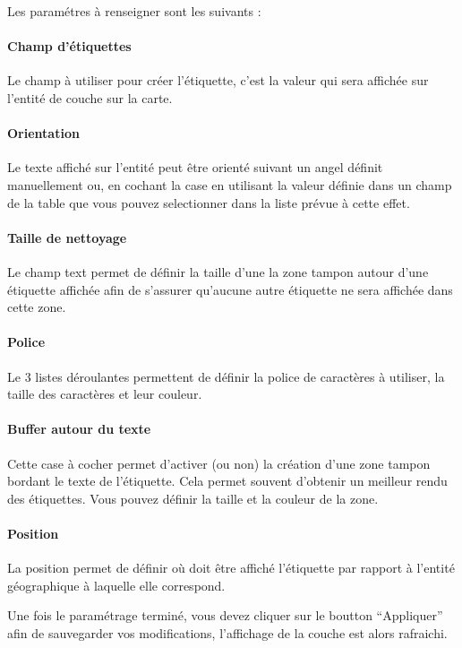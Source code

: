 \documentclass[letterpaper,10pt,french]{sphinxmanual}
\begin{document}
Les paramétres à renseigner sont les suivants :
\paragraph{Champ d'étiquettes}

Le champ à utiliser pour créer l'étiquette, c'est la valeur qui sera
affichée sur l'entité de couche sur la carte.
\paragraph{Orientation}

Le texte affiché sur l'entité peut être orienté suivant un angel
définit manuellement ou, en cochant la case en utilisant la valeur
définie dans un champ de la table que vous pouvez selectionner dans la
liste prévue à cette effet.
\paragraph{Taille de nettoyage}

Le champ text permet de définir la taille d'une la zone tampon autour
d'une étiquette affichée afin de s'assurer qu'aucune autre étiquette
ne sera affichée dans cette zone.
\paragraph{Police}

Le 3 listes déroulantes permettent de définir la police de caractères
à utiliser, la taille des caractères et leur couleur.
\paragraph{Buffer autour du texte}

Cette case à cocher permet d'activer (ou non) la création d'une zone
tampon bordant le texte de l'étiquette. Cela permet souvent d'obtenir
un meilleur rendu des étiquettes. Vous pouvez définir la taille et
la couleur de la zone.
\paragraph{Position}

La position permet de définir où doit être affiché l'étiquette par
rapport à l'entité géographique à laquelle elle correspond.

Une fois le paramétrage terminé, vous devez cliquer sur le boutton
``Appliquer'' afin de sauvegarder vos modifications, l'affichage de la
couche est alors rafraichi.
\end{document}
